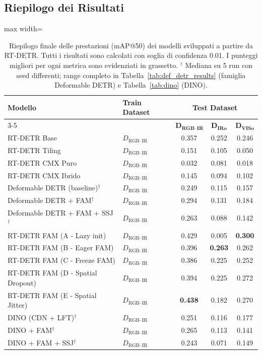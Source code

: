 \documentclass[a4paper,11pt]{article}
\begin{document}
\newpage

\subsection*{Riepilogo dei Risultati}

\begin{table}[htbp]
\centering
\caption{Riepilogo finale delle prestazioni (mAP@50) dei modelli sviluppati a partire da RT-DETR.
Tutti i risultati sono calcolati con soglia di confidenza 0.01. I punteggi migliori per ogni metrica sono evidenziati in grassetto. $^\dagger$ Mediana su 5 run con seed differenti; range completo in
Tabella~\ref{tab:def_detr_results} (famiglia Deformable DETR) e Tabella~\ref{tab:dino} (DINO).}
\label{tab:summary_rtdetr_onwards}
\begin{adjustbox}{max width=\textwidth}
\begin{tabular}{llccc}
\toprule
\multirow{2}{*}{\textbf{Modello}} & \multirow{2}{*}{\textbf{Train Dataset}} & \multicolumn{3}{c}{\textbf{Test Dataset}} \\
\cmidrule(lr){3-5}
& & $\boldsymbol{D_{\text{RGB--IR}}}$ & $\boldsymbol{D_{\text{IRo}}}$ & $\boldsymbol{D_{\text{VISo}}}$ \\
\midrule
RT-DETR Base & $D_{\text{RGB--IR}}$ & 0.357 & 0.252 & 0.246 \\
RT-DETR Tiling & $D_{\text{RGB--IR}}$ & 0.151 & 0.105 & 0.050 \\
RT-DETR CMX Puro & $D_{\text{RGB--IR}}$ & 0.032 & 0.081 & 0.018 \\
RT-DETR CMX Ibrido & $D_{\text{RGB--IR}}$ & 0.145 & 0.094 & 0.102 \\
Deformable DETR (baseline)$^\dagger$ & $D_{\text{RGB--IR}}$ & 0.249 & 0.115 & 0.157 \\
Deformable DETR + FAM$^\dagger$ & $D_{\text{RGB--IR}}$ & 0.294 & 0.131 & 0.184 \\
Deformable DETR + FAM + SSJ$^\dagger$ & $D_{\text{RGB--IR}}$ & 0.263 & 0.088 & 0.142 \\
RT-DETR FAM (A - Lazy init) & $D_{\text{RGB--IR}}$ & 0.429 & 0.005 & \textbf{0.300} \\
RT-DETR FAM (B - Eager FAM) & $D_\text{RGB--IR}$ & 0.396 & \textbf{0.263} & 0.262 \\
RT-DETR FAM (C - Freeze FAM) & $D_\text{RGB--IR}$ & 0.386 & 0.225 & 0.252 \\
RT-DETR FAM (D - Spatial Dropout) & $D_\text{RGB--IR}$ & 0.394 & 0.225 & 0.272 \\
RT-DETR FAM (E - Spatial Jitter) & $D_{\text{RGB--IR}}$ & \textbf{0.438} & 0.182 & 0.270 \\
DINO (CDN + LFT)$^\dagger$      & $D_{\text{RGB--IR}}$ & 0.251 & 0.116 & 0.177 \\
DINO + FAM$^\dagger$             & $D_{\text{RGB--IR}}$ & 0.265 & 0.113 & 0.141 \\
DINO + FAM + SSJ$^\dagger$       & $D_{\text{RGB--IR}}$ & 0.243 & 0.071 & 0.149 \\
\bottomrule
\end{tabular}
\end{adjustbox}
\end{table}
\end{document}
